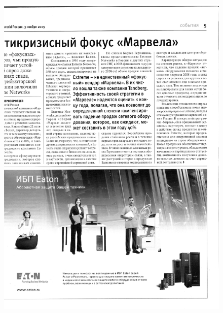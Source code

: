 \documentclass{book}
\begin{document}
\begin{figure}[H]
\begin{center}
\includegraphics[scale=0.2]{images/4cw.jpg}

\end{center}
\end{figure}
\end{document}

